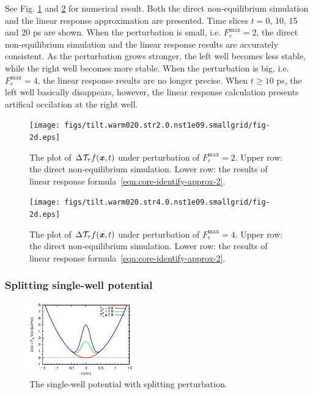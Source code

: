 \documentclass[aip,jcp,a4paper,reprint,onecolumn]{revtex4-1}
\newcommand{\vect}[1]{\textbf{\textit{#1}}}
\newcommand{\mt}{\mathcal T}
\begin{document}
See Fig. \ref{fig:tmp2} and \ref{fig:tmp3} for numerical result.  Both
the direct non-equilibrium simulation and the linear response
approximation are presented. Time slices $t = 0$, 10, 15 and 20
\textsf{ps} are shown.  When the perturbation is small,
i.e. $F_e^{\textrm{max}} = 2$, the direct non-equilibrium simulation
and the linear response results are accurately consistent. As the
perturbation grows stronger, the left well becomes less stable, while
the right well becomes more stable.  When the perturbation is big,
i.e. $F_e^{\textrm{max}} = 4$, the linear response results are no
longer precise. When $t\geq 10$ \textsf{ps}, the left well basically
disappears, however, the linear response calculation presents
artifical occilation at the right well.

\begin{figure}
  \centering
  \texttt{[image: figs/tilt.warm020.str2.0.nst1e09.smallgrid/fig-2d.eps]}
  \caption{The plot of $\Delta\mt_\tau f(\vect x,t)$  under perturbation of
    $F_e^{\textrm{max}} = 2$.
    Upper row: the direct non-equilibrium simulation. Lower row: the
    results of linear response formula~\eqref{eqn:core-identify-approx-2}.
  }
  \label{fig:tmp2}
\end{figure}

\begin{figure}
  \centering
  \texttt{[image: figs/tilt.warm020.str4.0.nst1e09.smallgrid/fig-2d.eps]}
  \caption{The plot of $\Delta\mt_\tau f(\vect x,t)$  under perturbation of
    $F_e^{\textrm{max}} = 4$.  Upper row: the direct non-equilibrium
    simulation. Lower row: the results of linear response
    formula~\eqref{eqn:core-identify-approx-2}.  }
  \label{fig:tmp3}
\end{figure}


\subsubsection{Splitting single-well potential}

\begin{figure}
  \centering
  \includegraphics[width=0.4\textwidth]{figs/fig-split-pot.eps}
  \caption{The single-well potential with splitting perturbation.}
  \label{fig:tmp4}
\end{figure}
\end{document}

